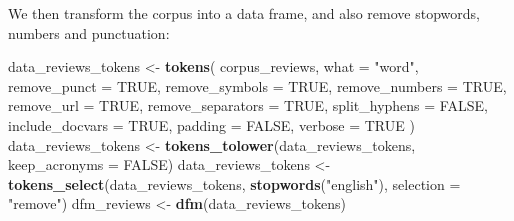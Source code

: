 \documentclass[
]{book}
\newenvironment{Shaded}{\begin{snugshade}}{\end{snugshade}}
\newcommand{\AttributeTok}[1]{\textcolor[rgb]{0.13,0.29,0.53}{#1}}
\newcommand{\ConstantTok}[1]{\textcolor[rgb]{0.56,0.35,0.01}{#1}}
\newcommand{\DecValTok}[1]{\textcolor[rgb]{0.00,0.00,0.81}{#1}}
\newcommand{\FloatTok}[1]{\textcolor[rgb]{0.00,0.00,0.81}{#1}}
\newcommand{\FunctionTok}[1]{\textcolor[rgb]{0.13,0.29,0.53}{\textbf{#1}}}
\newcommand{\NormalTok}[1]{#1}
\newcommand{\OtherTok}[1]{\textcolor[rgb]{0.56,0.35,0.01}{#1}}
\newcommand{\SpecialCharTok}[1]{\textcolor[rgb]{0.81,0.36,0.00}{\textbf{#1}}}
\newcommand{\StringTok}[1]{\textcolor[rgb]{0.31,0.60,0.02}{#1}}
\begin{document}
\begin{Shaded}
\end{Shaded}

We then transform the corpus into a data frame, and also remove stopwords, numbers and punctuation:

\begin{Shaded}
\begin{Highlighting}[]
\NormalTok{data\_reviews\_tokens }\OtherTok{\textless{}{-}} \FunctionTok{tokens}\NormalTok{(}
\NormalTok{ corpus\_reviews,}
 \AttributeTok{what =} \StringTok{"word"}\NormalTok{,}
 \AttributeTok{remove\_punct =} \ConstantTok{TRUE}\NormalTok{,}
 \AttributeTok{remove\_symbols =} \ConstantTok{TRUE}\NormalTok{,}
 \AttributeTok{remove\_numbers =} \ConstantTok{TRUE}\NormalTok{,}
 \AttributeTok{remove\_url =} \ConstantTok{TRUE}\NormalTok{,}
 \AttributeTok{remove\_separators =} \ConstantTok{TRUE}\NormalTok{,}
 \AttributeTok{split\_hyphens =} \ConstantTok{FALSE}\NormalTok{,}
 \AttributeTok{include\_docvars =} \ConstantTok{TRUE}\NormalTok{,}
 \AttributeTok{padding =} \ConstantTok{FALSE}\NormalTok{,}
 \AttributeTok{verbose =} \ConstantTok{TRUE}
\NormalTok{)}
\NormalTok{data\_reviews\_tokens }\OtherTok{\textless{}{-}} \FunctionTok{tokens\_tolower}\NormalTok{(data\_reviews\_tokens, }\AttributeTok{keep\_acronyms =} \ConstantTok{FALSE}\NormalTok{)}
\NormalTok{data\_reviews\_tokens }\OtherTok{\textless{}{-}} \FunctionTok{tokens\_select}\NormalTok{(data\_reviews\_tokens, }\FunctionTok{stopwords}\NormalTok{(}\StringTok{"english"}\NormalTok{), }\AttributeTok{selection =} \StringTok{"remove"}\NormalTok{)}
\NormalTok{dfm\_reviews }\OtherTok{\textless{}{-}} \FunctionTok{dfm}\NormalTok{(data\_reviews\_tokens)}
\end{Highlighting}
\end{Shaded}
\end{document}
